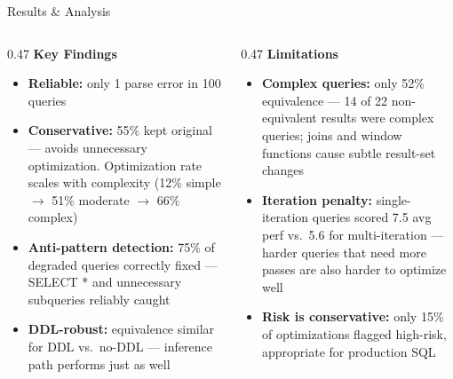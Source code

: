 \documentclass[10pt,aspectratio=169]{beamer}
\newcommand{\Raleway}{\sffamily}
\begin{document}
\begin{frame}{Results \& Analysis}
  \begin{columns}[T, onlytextwidth]
    \begin{column}{0.47\textwidth}
      {\small\Raleway\bfseries\color{aggieblue} Key Findings}\\[0.2em]
      \scriptsize
      \begin{itemize}
        \setlength{\itemsep}{0.2em}
        \item \textbf{Reliable:} only 1 parse error in 100 queries
        \item \textbf{Conservative:} 55\% kept original --- avoids unnecessary optimization. Optimization rate scales with complexity (12\% simple $\to$ 51\% moderate $\to$ 66\% complex)
        \item \textbf{Anti-pattern detection:} 75\% of degraded queries correctly fixed --- SELECT * and unnecessary subqueries reliably caught
        \item \textbf{DDL-robust:} equivalence similar for DDL vs.\ no-DDL --- inference path performs just as well
      \end{itemize}
    \end{column}
    \hfill
    \begin{column}{0.47\textwidth}
      {\small\Raleway\bfseries\color{aggieblue} Limitations}\\[0.2em]
      \scriptsize
      \begin{itemize}
        \setlength{\itemsep}{0.2em}
        \item \textbf{Complex queries:} only 52\% equivalence --- 14 of 22 non-equivalent results were complex queries; joins and window functions cause subtle result-set changes
        \item \textbf{Iteration penalty:} single-iteration queries scored 7.5 avg perf vs.\ 5.6 for multi-iteration --- harder queries that need more passes are also harder to optimize well
        \item \textbf{Risk is conservative:} only 15\% of optimizations flagged high-risk, appropriate for production SQL
      \end{itemize}
    \end{column}
  \end{columns}
\end{frame}


\end{document}
